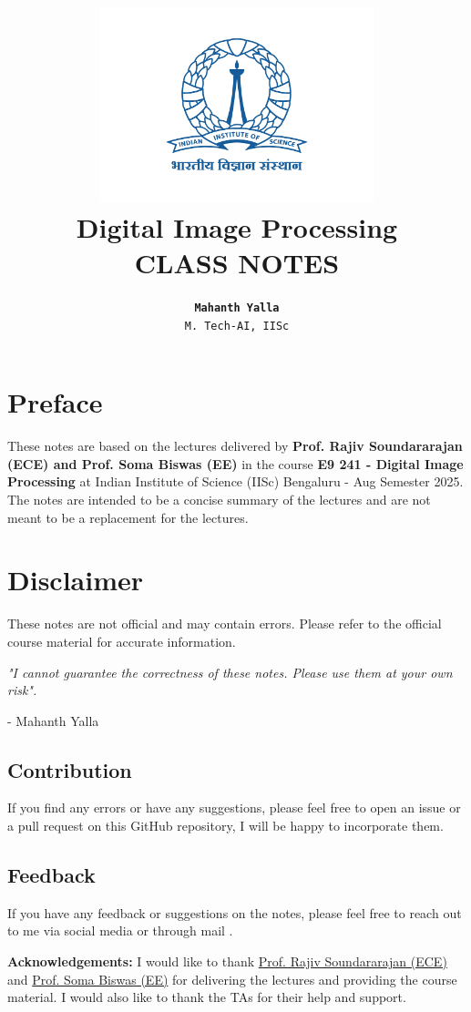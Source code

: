 \documentclass{report}
\title{
    \vspace{-2cm} %
    \includegraphics[width=8cm]{iisc-logo.png}\\ %
    \vspace{1cm} %
    {\huge \textbf{Digital Image Processing}}\\
    \vspace{0.5cm} %
    \textsf{\large CLASS NOTES}
}
\author{\LARGE{\textbf{\texttt{Mahanth Yalla}}}\\ \texttt{\large M. Tech-AI, IISc}}
\date{}
\begin{document}
\begin{titlepage}
    \centering
    \maketitle
\end{titlepage}

\newpage
{}

\section*{Preface}
These notes are based on the lectures delivered by {\bf Prof. Rajiv Soundararajan (ECE) and Prof. Soma Biswas (EE)} in the course {\bf E9 241 - Digital Image Processing} 
at Indian Institute of Science (IISc) Bengaluru - Aug Semester 2025. 
The notes are intended to be a concise summary of the lectures and are not meant to be a replacement for the lectures. 

\section*{Disclaimer}
These notes are not official and may contain errors. Please refer to the official course material for accurate information.

\textit{"I cannot guarantee the correctness of these notes. Please use them at your own risk".}

\hfill- Mahanth Yalla 

\subsection*{Contribution}
If you find any errors or have any suggestions, please feel free to open an issue or a pull request on this GitHub repository, I will be happy to incorporate them.
\subsection*{Feedback}
If you have any feedback or suggestions on the notes, please feel free to reach out to me via social media or through mail  .

\vfill
{\bf Acknowledgements:} I would like to thank \href{https://ece.iisc.ac.in/~rajivs/#/}{Prof. Rajiv Soundararajan (ECE)} and \href{https://ee.iisc.ac.in/soma-biswas/}{Prof. Soma Biswas (EE)} for delivering the lectures and providing the course material. 
I would also like to thank the TAs for their help and support. 

\tableofcontents
\pagebreak

% 
% 
% 
% 




\end{document}
